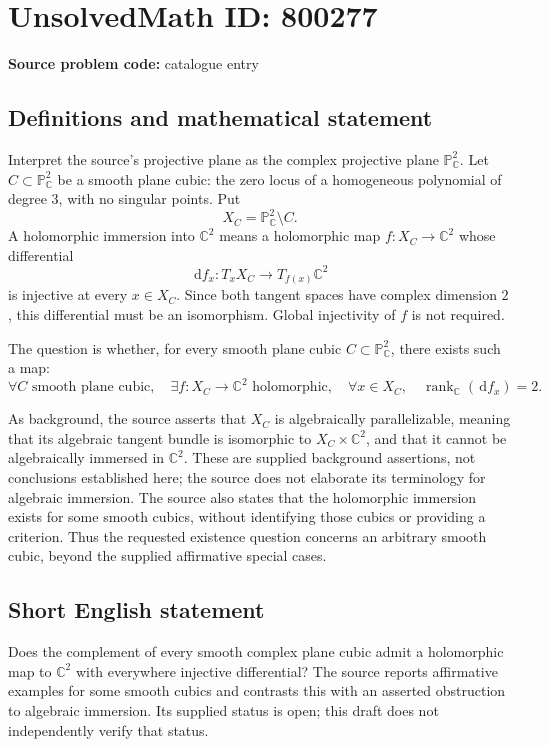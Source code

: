 \documentclass[11pt]{article}
\newcommand{\C}{\mathbb{C}}
\newcommand{\dd}{\,\mathrm{d}}
\begin{document}
\section*{UnsolvedMath ID: 800277}
\textbf{Source problem code:} catalogue entry
\subsection{Definitions and mathematical statement}
Interpret the source's projective plane as the complex projective plane \(\mathbb{P}^{2}_{\C}\). Let \(C\subset\mathbb{P}^{2}_{\C}\) be a smooth plane cubic: the zero locus of a homogeneous polynomial of degree \(3\), with no singular points. Put
\[
X_C=\mathbb{P}^{2}_{\C}\setminus C.
\]
A holomorphic immersion into \(\C^2\) means a holomorphic map \(f:X_C\to\C^2\) whose differential
\[
\dd f_x:T_xX_C\longrightarrow T_{f(x)}\C^2
\]
is injective at every \(x\in X_C\). Since both tangent spaces have complex dimension \(2\), this differential must be an isomorphism. Global injectivity of \(f\) is not required.

The question is whether, for every smooth plane cubic \(C\subset\mathbb{P}^{2}_{\C}\), there exists such a map:
\[
\forall C\text{ smooth plane cubic},\quad
\exists f:X_C\to\C^2\text{ holomorphic},\quad
\forall x\in X_C,\quad \operatorname{rank}_{\C}(\dd f_x)=2.
\]

As background, the source asserts that \(X_C\) is algebraically parallelizable, meaning that its algebraic tangent bundle is isomorphic to \(X_C\times\C^2\), and that it cannot be algebraically immersed in \(\C^2\). These are supplied background assertions, not conclusions established here; the source does not elaborate its terminology for algebraic immersion. The source also states that the holomorphic immersion exists for some smooth cubics, without identifying those cubics or providing a criterion. Thus the requested existence question concerns an arbitrary smooth cubic, beyond the supplied affirmative special cases.
\subsection{Short English statement}
Does the complement of every smooth complex plane cubic admit a holomorphic map to \(\C^2\) with everywhere injective differential? The source reports affirmative examples for some smooth cubics and contrasts this with an asserted obstruction to algebraic immersion. Its supplied status is open; this draft does not independently verify that status.
\end{document}

